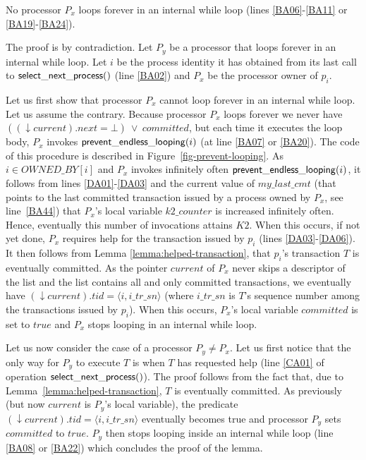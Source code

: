 \begin{lemma}
\label{lemma:no-infinite-loop}
No processor $P_x$ loops forever in an internal while loop
(lines \ref{BA06}-\ref{BA11} or  \ref{BA19}-\ref{BA24}). 
\end{lemma}

\begin{proofL} 
The proof is by contradiction.
Let $P_y$ be a processor that loops  forever in an internal while loop. 
Let $i$ be the process identity it has obtained from its last call to 
${\sf select\_next\_process}()$ (line  \ref{BA02}) and $P_x$  be
the processor owner of $p_i$. 

Let us first show that  processor $P_x$ cannot loop forever in an internal
 while loop. Let us assume the contrary. 
Because processor $P_x$ loops forever we never have $((\downarrow current).next=\bot)~\vee~
\mathit{committed}$, but each time it executes the loop body, 
$P_x$ invokes ${\sf prevent\_endless\_looping}(i)$ (at line \ref{BA07} 
or \ref{BA20}). The code of this procedure is described in 
Figure~\ref{fig-prevent-looping}.  
As $i \in \mathit{OWNED\_BY}[i]$ and $P_x$ invokes infinitely often 
${\sf prevent\_endless\_looping}(i)$, it follows from lines 
\ref{DA01}-\ref{DA03}  and the current value of  $my\_last\_cmt$ (that 
points  to the last committed transaction issued by a process owned by 
$P_x$, see line~\ref{BA44}) that 
$P_x$'s local variable $k2\_counter$ is increased infinitely often.
Hence, eventually this number of invocations attains $K2$. 
When this  occurs, if not yet done, $P_x$ requires help  for the 
transaction issued by $p_i$ (lines \ref{DA03}-\ref{DA06}). 
It then follows from  Lemma \ref{lemma:helped-transaction},  
that $p_i$'s  transaction $T$  is  eventually  committed. As the  pointer
$current$ of $P_x$ never skips a descriptor of the list
and the list contains all and only committed transactions, 
we eventually have $(\downarrow current).tid = \langle i,i\_tr\_sn \rangle$
(where $i\_tr\_sn$  is $T$'s sequence number among the transactions issued
by $p_i$). When this occurs,  $P_x$'s local variable  $\mathit{committed}$ 
is set to $\mathit{true}$ and $P_x$ stops looping in an internal while loop. 


Let us now consider the case of a processor  $P_y \neq P_x$. 
Let us first notice that the only way for $P_y$ to execute $T$ is when 
$T$ has requested help (line \ref{CA01} of operation ${\sf select\_next\_process}()$).
The proof follows from the fact that, due to
 Lemma~\ref{lemma:helped-transaction}, $T$ is eventually committed. 
As previously (but now  $current$ is  $P_y$'s local variable),
the predicate  $(\downarrow current).tid = \langle i,i\_tr\_sn \rangle$ 
eventually becomes true and processor $P_y$ sets  $\mathit{committed}$ 
 to $\mathit{true}$. $P_y$ then stops looping inside an internal while 
loop (line \ref{BA08} or \ref{BA22})  which concludes the proof of the lemma.
\renewcommand{\toto}{lemma:no-infinite-loop}
\end{proofL}

